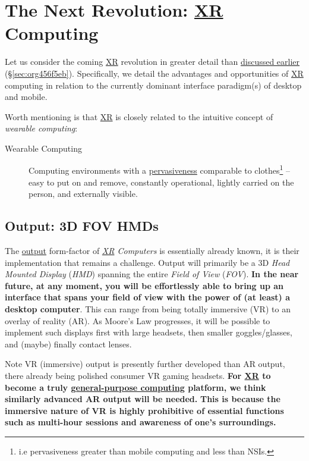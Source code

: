 \documentclass[logo,bsc,singlespacing,parskip]{infthesis}
\begin{document}
\chapter{The Next Revolution: \hyperref[orgf7f8e78]{XR} Computing}
\label{sec:org3989e0b}
Let us consider the coming \hyperref[orgf7f8e78]{XR} revolution in greater detail than \hyperref[sec:org456f5eb]{discussed earlier} (\S \ref{sec:org456f5eb}).
Specifically, we detail the advantages and opportunities of \hyperref[orgf7f8e78]{XR} computing in relation to the currently dominant interface paradigm(s) of desktop and mobile.

Worth mentioning is that \hyperref[orgf7f8e78]{XR} is closely related to the intuitive concept of \emph{wearable computing}:

\begin{mdframed}
\begin{description}
\item[{Wearable Computing\label{wearable computing}}] Computing environments with a \hyperref[pervasiveness]{pervasiveness} comparable to clothes\footnote{i.e pervasiveness greater than mobile computing and less than NSIs.} -- easy to put on and remove, constantly operational, lightly carried on the person, and externally visible.
\end{description}
\end{mdframed}
\section{Output: 3D FOV HMDs}
\label{sec:org8c8351f}
The \hyperref[output]{output} form-factor of \emph{\hyperref[orgf7f8e78]{XR} Computers} is essentially already known, it is their implementation that remains a challenge.
Output will primarily be a 3D \emph{Head Mounted Display} (\emph{HMD}) spanning the entire \emph{Field of View} (\emph{FOV}).
\textbf{In the near future, at any moment, you will be effortlessly able to bring up an interface that spans your field of view with the power of (at least) a desktop computer}.
This can range from being totally immersive (VR) to an overlay of reality (AR).
As Moore's Law progresses, it will be possible to implement such displays first with large headsets, then smaller goggles/glasses, and (maybe) finally contact lenses.

Note VR (immersive) output is presently further developed than AR output, there already being polished consumer VR gaming headsets.
\textbf{For \hyperref[orgf7f8e78]{XR} to become a truly \hyperref[org628f737]{general-purpose computing} platform, we think similarly advanced AR output will be needed.}
\textbf{This is because the immersive nature of VR is highly prohibitive of essential functions such as multi-hour sessions and awareness of one's surroundings.}
\end{document}
